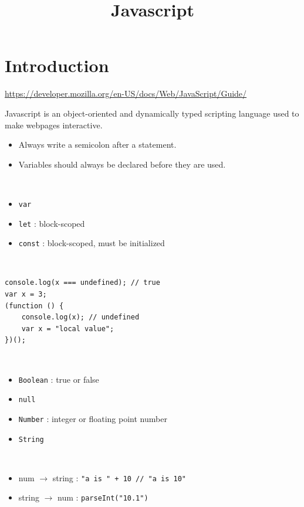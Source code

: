 \documentclass{blog}
\title{Javascript}
\begin{document}
\maketitle
\tableofcontents
\section{Introduction}
\url{https://developer.mozilla.org/en-US/docs/Web/JavaScript/Guide/}

\begin{definition}[javascript]
    Javascript is an object-oriented and dynamically typed scripting language used to make webpages interactive.
\end{definition}

\begin{itemize}
    \item Always write a semicolon after a statement.
    \item Variables should always be declared before they are used.
\end{itemize}

\begin{definition}[declaration]~
    \begin{itemize}
        \item \verb|var|
        \item \verb|let| : block-scoped
        \item \verb|const| : block-scoped, must be initialized
    \end{itemize}
\end{definition}

\begin{example}~
    \begin{verbatim}
console.log(x === undefined); // true
var x = 3;
(function () {
    console.log(x); // undefined
    var x = "local value";
})();
\end{verbatim}
\end{example}

\begin{definition}[types]~
    \begin{itemize}
        \item \verb|Boolean| : true or false
        \item \verb|null|
        \item \verb|Number| : integer or floating point number
        \item \verb|String|
    \end{itemize}
\end{definition}

\begin{definition}~
    \begin{itemize}
        \item num $\to$ string : \verb|"a is " + 10 // "a is 10"|
        \item string $\to$ num : \verb|parseInt("10.1")|
    \end{itemize}
\end{definition}

\printbibliography
\end{document}
